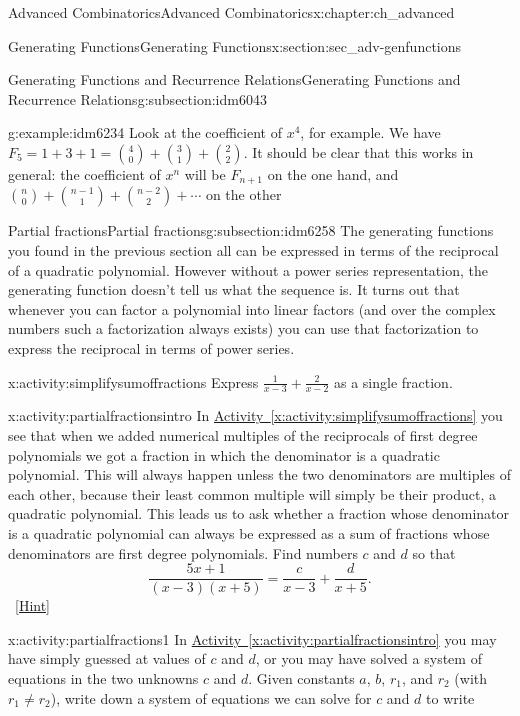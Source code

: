 \documentclass[oneside,10pt,]{book}
\numberwithin{equation}{chapter}
\begin{document}
\begin{chapterptx}{Advanced Combinatorics}{}{Advanced Combinatorics}{}{}{x:chapter:ch_advanced}
\begin{sectionptx}{Generating Functions}{}{Generating Functions}{}{}{x:section:sec_adv-genfunctions}
\begin{subsectionptx}{Generating Functions and Recurrence Relations}{}{Generating Functions and Recurrence Relations}{}{}{g:subsection:idm6043}
\begin{example}{}{g:example:idm6234}
Look at the coefficient of \(x^4\), for example.  We have \(F_5 = 1 + 3 + 1 = \binom{4}{0} + \binom{3}{1} + \binom{2}{2}\).  It should be clear that this works in general: the coefficient of \(x^n\) will be \(F_{n+1}\) on the one hand, and \(\binom{n}{0} + \binom{n-1}{1} + \binom{n-2}{2}+ \cdots\) on the other%
\end{example}
\end{subsectionptx}
%
%
\typeout{************************************************}
\typeout{************************************************}
%
\begin{subsectionptx}{Partial fractions}{}{Partial fractions}{}{}{g:subsection:idm6258}
The generating functions you found in the previous section all can be expressed in terms of the reciprocal of a quadratic polynomial. However without a power series representation, the generating function doesn't tell us what the sequence is. It turns out that whenever you can factor a polynomial into linear factors (and over the complex numbers such a factorization always exists) you can use that factorization to express the reciprocal in terms of power series.%
\begin{activity}{}{x:activity:simplifysumoffractions}%
Express \(\frac{1}{x-3} + \frac{2}{x-2}\) as a single fraction.%
\end{activity}
\begin{activity}{}{x:activity:partialfractionsintro}%
In \hyperref[x:activity:simplifysumoffractions]{Activity~\ref{x:activity:simplifysumoffractions}} you see that when we added numerical multiples of the reciprocals of first degree polynomials we got a fraction in which the denominator is a quadratic polynomial. This will always happen unless the two denominators are multiples of each other, because their least common multiple will simply be their product, a quadratic polynomial. This leads us to ask whether a fraction whose denominator is a quadratic polynomial can always be expressed as a sum of fractions whose denominators are first degree polynomials. Find numbers \(c\) and \(d\) so that%
\begin{equation*}
\frac{5x+1}{(x-3)(x+5)} = \frac{c}{x-3} + \frac{d}{x+5}.
\end{equation*}
%
\qquad~\hfill{\tiny\hyperlink{g:hint:idm6275-back}{[Hint]}}\end{activity}
\begin{activity}{}{x:activity:partialfractions1}%
In \hyperref[x:activity:partialfractionsintro]{Activity~\ref{x:activity:partialfractionsintro}} you may have simply guessed at values of \(c\) and \(d\), or you may have solved a system of equations in the two unknowns \(c\) and \(d\). Given constants \(a\), \(b\), \(r_1\), and \(r_2\) (with \(r_1\not= r_2\)), write down a system of equations we can solve for \(c\) and \(d\) to write%

\end{activity}
\end{subsectionptx}
\end{sectionptx}
\end{chapterptx}
\end{document}
